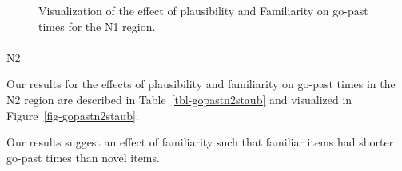 \documentclass[
  12pt,
  letterpaper,
]{scrreprt}
\makeatletter
\let\oldparagraph\paragraph
\renewcommand{\paragraph}{
    \@ifstar
      \xxxParagraphStar
      \xxxParagraphNoStar
  }
\newcommand{\xxxParagraphStar}[1]{\oldparagraph*{#1}\mbox{}}
\newcommand{\xxxParagraphNoStar}[1]{\oldparagraph{#1}\mbox{}}
\makeatother
\begin{document}
\begin{figure}[htbp]

\caption{\label{fig-gopastn1staub}Visualization of the effect of
plausibility and Familiarity on go-past times for the N1 region.}


\end{figure}%

\paragraph{N2}\label{n2-2}

Our results for the effects of plausibility and familiarity on go-past
times in the N2 region are described in Table~\ref{tbl-gopastn2staub}
and visualized in Figure~\ref{fig-gopastn2staub}.

Our results suggest an effect of familiarity such that familiar items
had shorter go-past times than novel items.
\end{document}
